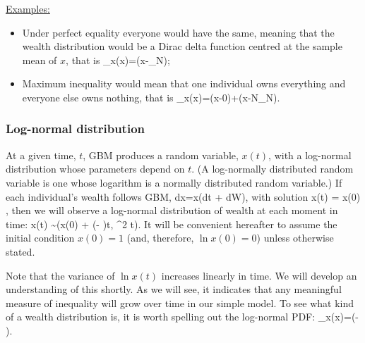 \underline{Examples:}
\begin{itemize}
\item Under perfect equality everyone would have the same, meaning that the wealth
distribution would be a Dirac delta function centred at the sample mean of $x$, that is
\be
\PDF_x(x)=\delta(x-_N);
\ee
\item
Maximum inequality would mean that one individual owns everything
and everyone else owns nothing, that is
\be 
\PDF_x(x)=\delta(x-0)+\delta(x-N_N).
\ee
\end{itemize}


\subsubsection{Log-normal distribution}
At a given time, $t$, GBM produces a random variable, $x(t)$, with a log-normal distribution whose parameters depend on $t$. (A log-normally distributed random variable is one whose logarithm is a normally distributed random variable.) If each individual's wealth follows GBM,
\be
dx=x(\mu dt + \sigma dW),
\ee
with solution 
\be
x(t) = x(0) \exp{},
\ee
then we will observe a log-normal distribution of wealth at each moment in time:
\be
\ln x(t) \sim {}\left(\ln x(0) + \left(\mu - \right)t, \sigma^2 t\right).
\ee
It will be convenient hereafter to assume the initial condition $x(0)=1$ (and, therefore, $\ln x(0)=0$) unless otherwise stated.

Note that the variance of $\ln x(t)$ increases linearly in time. We will develop an understanding of this shortly. As we will see, it indicates that any meaningful measure of inequality will grow over time in our simple model. To see what kind of a wealth distribution  is, it is worth spelling out the log-normal PDF:
\be
\PDF_x(x)=\exp\left(- \right).
\ee

